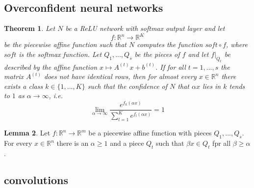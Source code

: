 \documentclass[a4paper, 12pt]{article}
\theoremstyle{plain}
\newtheorem{theorem}{Theorem}[subsection] %
\theoremstyle{definition}
\theoremstyle{lemma}
\newtheorem{lemma}[theorem]{Lemma}
\theoremstyle{remark}
\theoremstyle{example}
\begin{document}
	\subsection{Overconfident neural networks}
	\begin{theorem}
		Let $N$ be a ReLU network with softmax output layer and let \[f:\mathbb{R}^n \to \mathbb{R}^K\] be the piecewise affine function such that $N$ computes the function $soft\circ f$, where $soft$ is the softmax function. Let $Q_1,...,Q_s$ be the pieces of $f$ and let $f|_{Q_t}$ be described by the affine function $x \mapsto A^{(t)}x+b^{(t)}$. If for all $t=1,...,s$ the matrix $A^{(t)}$ does not have identical rows, then for almost every $x\in\mathbb{R}^n$ there exists a class $k\in \{1,...,K\}$ such that the confidence of $N$ that $\alpha x$ lies in $k$ tends to $1$ as $\alpha \to \infty$, i.e. \[\lim\limits_{\alpha \to \infty} \frac{e^{f_k(\alpha x)}}{\sum_{l=1}^{K} e^{f_l(\alpha x)}} = 1\]
	\end{theorem}
	\begin{lemma}
		Let $f: \mathbb{R}^n \to \mathbb{R}^m$ be a piecewise affine function with pieces $Q_1,...,Q_s.$ For every $x \in \mathbb{R}^n$ there is an $\alpha \geq 1$ and a piece $Q_t$ such that $\beta x \in Q_t$ fpr all $\beta \geq \alpha$.
	\end{lemma}
	\subsection{convolutions}
	
\end{document}
